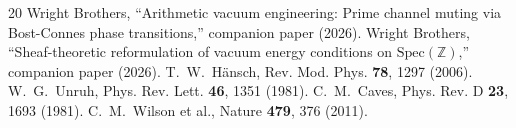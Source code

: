 \documentclass[11pt,a4paper]{article}
\newcommand{\Spec}{\mathrm{Spec}}
\begin{document}
\begin{thebibliography}{20}
 Wright Brothers, ``Arithmetic vacuum engineering: Prime channel muting via Bost-Connes phase transitions,'' companion paper (2026).
 Wright Brothers, ``Sheaf-theoretic reformulation of vacuum energy conditions on $\Spec(\mathbb{Z})$,'' companion paper (2026).
 T.~W.~H\"ansch, Rev. Mod. Phys. \textbf{78}, 1297 (2006).
 W.~G.~Unruh, Phys. Rev. Lett. \textbf{46}, 1351 (1981).
 C.~M.~Caves, Phys. Rev. D \textbf{23}, 1693 (1981).
 C.~M.~Wilson et al., Nature \textbf{479}, 376 (2011).
\end{thebibliography}
\end{document}
